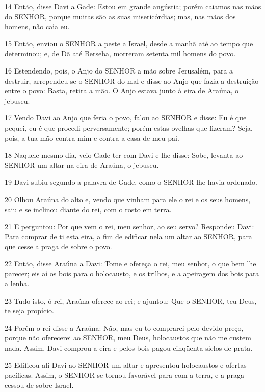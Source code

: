 \par 14 Então, disse Davi a Gade: Estou em grande angústia; porém caiamos nas mãos do SENHOR, porque muitas são as suas misericórdias; mas, nas mãos dos homens, não caia eu.
\par 15 Então, enviou o SENHOR a peste a Israel, desde a manhã até ao tempo que determinou; e, de Dã até Berseba, morreram setenta mil homens do povo.
\par 16 Estendendo, pois, o Anjo do SENHOR a mão sobre Jerusalém, para a destruir, arrependeu-se o SENHOR do mal e disse ao Anjo que fazia a destruição entre o povo: Basta, retira a mão. O Anjo estava junto à eira de Araúna, o jebuseu.
\par 17 Vendo Davi ao Anjo que feria o povo, falou ao SENHOR e disse: Eu é que pequei, eu é que procedi perversamente; porém estas ovelhas que fizeram? Seja, pois, a tua mão contra mim e contra a casa de meu pai.
\par 18 Naquele mesmo dia, veio Gade ter com Davi e lhe disse: Sobe, levanta ao SENHOR um altar na eira de Araúna, o jebuseu.
\par 19 Davi subiu segundo a palavra de Gade, como o SENHOR lhe havia ordenado.
\par 20 Olhou Araúna do alto e, vendo que vinham para ele o rei e os seus homens, saiu e se inclinou diante do rei, com o rosto em terra.
\par 21 E perguntou: Por que vem o rei, meu senhor, ao seu servo? Respondeu Davi: Para comprar de ti esta eira, a fim de edificar nela um altar ao SENHOR, para que cesse a praga de sobre o povo.
\par 22 Então, disse Araúna a Davi: Tome e ofereça o rei, meu senhor, o que bem lhe parecer; eis aí os bois para o holocausto, e os trilhos, e a apeiragem dos bois para a lenha.
\par 23 Tudo isto, ó rei, Araúna oferece ao rei; e ajuntou: Que o SENHOR, teu Deus, te seja propício.
\par 24 Porém o rei disse a Araúna: Não, mas eu to comprarei pelo devido preço, porque não oferecerei ao SENHOR, meu Deus, holocaustos que não me custem nada. Assim, Davi comprou a eira e pelos bois pagou cinqüenta siclos de prata.
\par 25 Edificou ali Davi ao SENHOR um altar e apresentou holocaustos e ofertas pacíficas. Assim, o SENHOR se tornou favorável para com a terra, e a praga cessou de sobre Israel.


